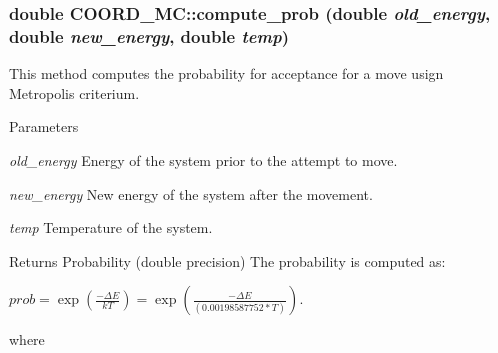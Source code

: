 \hypertarget{classCOORD__MC_a35f89a9d58d63bddebc1f3e5e48c4091}{
\subsubsection[{compute\_\-prob}]{\setlength{\rightskip}{0pt plus 5cm}double COORD\_\-MC::compute\_\-prob (double {\em old\_\-energy}, \/  double {\em new\_\-energy}, \/  double {\em temp})}}
\label{classCOORD__MC_a35f89a9d58d63bddebc1f3e5e48c4091}
This method computes the probability for acceptance for a move usign Metropolis criterium. 
\begin{DoxyParams}{Parameters}
\item[{\em old\_\-energy}]Energy of the system prior to the attempt to move. \item[{\em new\_\-energy}]New energy of the system after the movement. \item[{\em temp}]Temperature of the system. \end{DoxyParams}
\begin{DoxyReturn}{Returns}
Probability (double precision) The probability is computed as:
\end{DoxyReturn}
$ prob = \exp(\frac{-\Delta E}{kT}) = \exp(\frac{-\Delta E}{(0.00198587752*T)})$.

where

